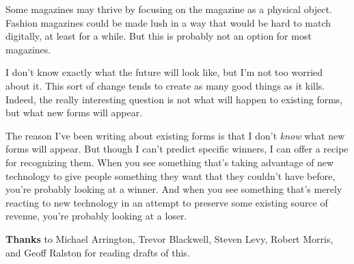 Some magazines may thrive by focusing on the magazine as a physical
object. Fashion magazines could be made lush in a way that would be hard
to match digitally, at least for a while. But this is probably not an
option for most magazines.

I don't know exactly what the future will look like, but I'm not too
worried about it. This sort of change tends to create as many good
things as it kills. Indeed, the really interesting question is not what
will happen to existing forms, but what new forms will appear.

The reason I've been writing about existing forms is that I don't
\emph{know} what new forms will appear. But though I can't predict
specific winners, I can offer a recipe for recognizing them. When you
see something that's taking advantage of new technology to give people
something they want that they couldn't have before, you're probably
looking at a winner. And when you see something that's merely reacting
to new technology in an attempt to preserve some existing source of
revenue, you're probably looking at a loser.


\textbf{Thanks} to Michael Arrington, Trevor Blackwell, Steven Levy,
Robert Morris, and Geoff Ralston for reading drafts of this.